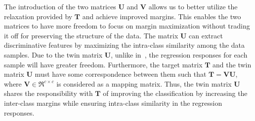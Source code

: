 The introduction of the two matrices $\bm{U}$ and $\bm{V}$ allows us to better utilize the relaxation provided by $\bm{T}$ and achieve improved margins. This enables the two matrices to have more freedom to focus on margin maximization without trading it off for preserving the structure of the data. The matrix $\bm{U}$ can extract discriminative features by maximizing the intra-class similarity among the data samples. Due to the twin matrix $\bm{U}$, unlike in~\cite{DLSR, ReLSR}, the regression responses for each sample will have greater freedom. Furthermore, the target matrix $\bm{T}$ and the twin matrix $\bm{U}$ must have some correspondence between them such that $\bm{T}=\bm{V}\bm{U}$, where $\bm{V} \in \Re^{c \times c}$ is considered as a mapping matrix. Thus, the twin matrix $\bm{U}$ shares the responsibility with $\bm{T}$ of improving the classification by increasing the inter-class margins while ensuring intra-class similarity in the regression responses.

